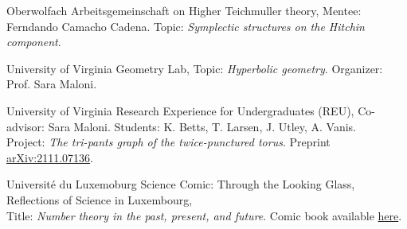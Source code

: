 {Oberwolfach}
{Arbeitsgemeinschaft on Higher Teichmuller theory,}
{Mentee: Ferndando Camacho Cadena. Topic: \emph{Symplectic structures on the Hitchin component}.}

{University of Virginia}
{Geometry Lab,}
{Topic: \emph{Hyperbolic geometry}. Organizer: Prof. Sara Maloni.}

{University of Virginia}
{Research Experience for Undergraduates (REU),}
{Co-advisor: Sara Maloni. Students: K. Betts, T. Larsen, J. Utley, A. Vanis. \\Project: \emph{The tri-pants graph of the twice-punctured torus}. Preprint \href{https://arxiv.org/abs/2111.07136}{arXiv:2111.07136}.}

{Universit{\'e} du Luxemoburg}
{Science Comic: Through the Looking Glass, Reflections of Science}
{\vspace{-0.3em}
{\normalsize in Luxembourg,} \\
Title: \emph{Number theory in the past, present, and future}. Comic book available \href{https://www.yumpu.com/en/document/view/62710549/science-comic-through-the-looking-glass-reflections-of-science-in-luxembourg}{here}.}
